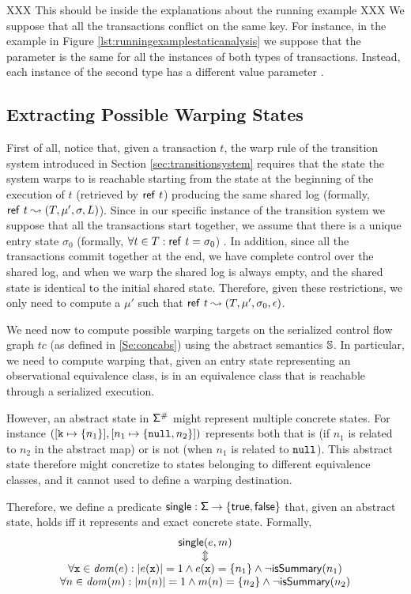 XXX This should be inside the explanations about the running example XXX We suppose that all the transactions conflict on the same key. For instance, in the example in Figure \ref{lst:runningexamplestaticanalysis} we suppose that the parameter  is the same for all the instances of both types of transactions. Instead, each instance of the second type has a different value parameter .
	

\subsection{Extracting Possible Warping States}
First of all, notice that, given a transaction $t$, the {\sf warp} rule of the transition system introduced in Section \ref{sec:transitionsystem} requires that the state the system warps to is reachable starting from the state at the beginning of the execution of $t$ (retrieved by ${\sf ref}\ t$) producing the same shared log (formally, ${\sf ref}\ t \leadsto (T,\mu', \sigma, L)$). Since in our specific instance of the transition system we suppose that all the transactions start together, we assume that there is a unique entry state $\sigma_0$ (formally, $\forall t \in T : {\sf ref}\ t=\sigma_0$) . In addition, since all the transactions commit together at the end, we have complete control over the shared log, and when we warp the shared log is always empty, and the shared state is identical to the initial shared state. Therefore, given these restrictions, we only need to compute a $\mu'$ such that ${\sf ref}\ t \leadsto (T,\mu', \sigma_0, \epsilon)$.

We need now to compute possible warping targets on the serialized control flow graph $tc$ (as defined in \ref{Se:concabs}) using the abstract semantics $\mathbb{S}$. In particular, we need to compute warping that, given an entry state representing an observational equivalence class, is in an equivalence class that is reachable through a serialized execution. 

However, an abstract state in $\mathsf{\Sigma}^\#$ might represent multiple concrete states. For instance $([\mathtt{k} \mapsto \{n_1\}], [n_1 \mapsto \{\mathtt{null}, n_2\}])$ represents both that   is (if $n_1$ is related to $n_2$ in the abstract map) or is not (when $n_1$ is related to $\mathtt{null}$). This abstract state therefore might concretize to states belonging to different equivalence classes, and it cannot used to define a warping destination.

Therefore, we define a predicate $\mathsf{single} : \mathsf{\Sigma} \to \{\mathsf{true}, \mathsf{false}\}$ that, given an abstract state, holds iff it represents and exact concrete state. Formally,
\[
\begin{array}{c}
\mathsf{single}(e, m)\\
\Updownarrow\\
\forall \mathtt{x} \in \mathit{dom}(e) : |e(\mathtt{x})|=1 \land e(\mathtt{x})=\{n_1\} \land \neg \mathsf{isSummary}(n_1)\\
\forall n \in \mathit{dom}(m) : |m(n)|=1 \land m(n)=\{n_2\} \land \neg \mathsf{isSummary}(n_2)\\
\end{array}
\]

